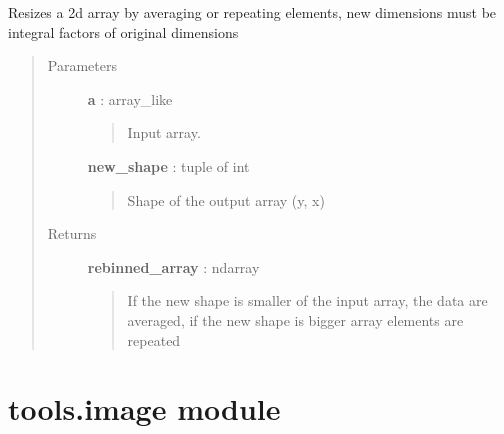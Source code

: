 \documentclass[letterpaper,10pt,english]{sphinxmanual}
\begin{document}
\begin{fulllineitems}
\label{tools:tools.detutils.rebin}
Resizes a 2d array by averaging or repeating elements, 
new dimensions must be integral factors of original dimensions
\begin{quote}\begin{description}
\item[{Parameters}] \leavevmode
\textbf{a} : array\_like
\begin{quote}

Input array.
\end{quote}

\textbf{new\_shape} : tuple of int
\begin{quote}

Shape of the output array (y, x)
\end{quote}

\item[{Returns}] \leavevmode
\textbf{rebinned\_array} : ndarray
\begin{quote}

If the new shape is smaller of the input array, the data are averaged, 
if the new shape is bigger array elements are repeated
\end{quote}

\end{description}\end{quote}

\end{fulllineitems}



\section{tools.image module}
\label{tools:tools-image-module}\label{tools:module-tools.image}
\end{document}
